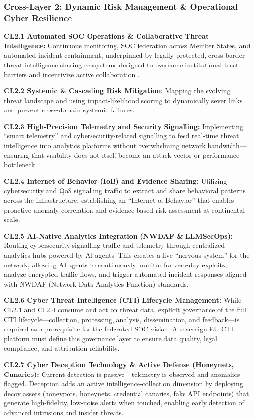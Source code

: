 \documentclass{ieeeaccess}
\begin{document}
\subsubsection*{Cross-Layer 2: Dynamic Risk Management \& Operational Cyber Resilience}
\textbf{CL2.1 Automated SOC Operations \& Collaborative Threat Intelligence:} Continuous monitoring, SOC federation across Member States, and automated incident containment, underpinned by legally protected, cross-border threat intelligence sharing ecosystems designed to overcome institutional trust barriers and incentivize active collaboration \cite{concordia}.

\textbf{CL2.2 Systemic \& Cascading Risk Mitigation:} Mapping the evolving threat landscape and using impact-likelihood scoring to dynamically sever links and prevent cross-domain systemic failures.

\textbf{CL2.3 High-Precision Telemetry and Security Signalling:} Implementing ``smart telemetry'' and cybersecurity-related signalling to feed real-time threat intelligence into analytics platforms without overwhelming network bandwidth---ensuring that visibility does not itself become an attack vector or performance bottleneck.

\textbf{CL2.4 Internet of Behavior (IoB) and Evidence Sharing:} Utilizing cybersecurity and QoS signalling traffic to extract and share behavioral patterns across the infrastructure, establishing an ``Internet of Behavior'' that enables proactive anomaly correlation and evidence-based risk assessment at continental scale.

\textbf{CL2.5 AI-Native Analytics Integration (NWDAF \& LLMSecOps):} Routing cybersecurity signalling traffic and telemetry through centralized analytics hubs powered by AI agents. This creates a live ``nervous system'' for the network, allowing AI agents to continuously monitor for zero-day exploits, analyze encrypted traffic flows, and trigger automated incident responses aligned with NWDAF (Network Data Analytics Function) standards.

\textbf{CL2.6 Cyber Threat Intelligence (CTI) Lifecycle Management:} While CL2.1 and CL2.4 consume and act on threat data, explicit governance of the full CTI lifecycle---collection, processing, analysis, dissemination, and feedback---is required as a prerequisite for the federated SOC vision. A sovereign EU CTI platform must define this governance layer to ensure data quality, legal compliance, and attribution reliability.

\textbf{CL2.7 Cyber Deception Technology \& Active Defense (Honeynets, Canaries):} Current detection is passive---telemetry is observed and anomalies flagged. Deception adds an active intelligence-collection dimension by deploying decoy assets (honeypots, honeynets, credential canaries, fake API endpoints) that generate high-fidelity, low-noise alerts when touched, enabling early detection of advanced intrusions and insider threats.
\end{document}
